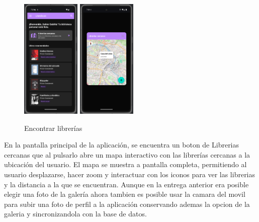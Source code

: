 \documentclass[a4paper,11pt]{report}
\begin{document}
      \begin{figure}[H]
        \centering
        \includegraphics[width=0.25\textwidth]{.img/mapa_boton.png}
        \hspace{2cm}
        \includegraphics[width=0.25\textwidth]{.img/mapa_fragment.png}
        \caption{Encontrar librerías}
        \label{fig:mapa}
      \end{figure}
      En la pantalla principal de la aplicación, se encuentra un boton de Librerias cercanas que al pulsarlo abre un mapa interactivo con las librerías cercanas a la ubicación del usuario. 
      El mapa se muestra a pantalla completa, permitiendo al usuario desplazarse, hacer zoom y interactuar con los iconos para ver las librerias y la distancia a la que se encuentran.
      Aunque en la entrega anterior era posible elegir una foto de la galería ahora tambien es posible usar la camara del movil para subir una foto de perfil a la aplicación conservando ademas la opcion de la galeria y sincronizandola con la base de datos.
\end{document}

